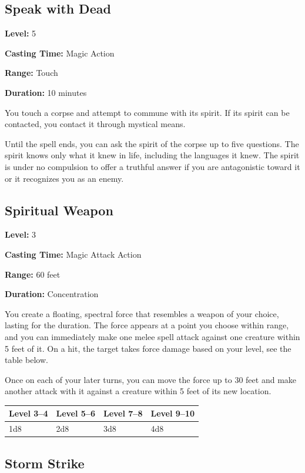 \documentclass[12pt,letterpaper,twocolumn,openany,nodeprecatedcode,bg=none]{dndbook}
\begin{document}
\subsection{Speak with Dead}\label{speak-with-dead}

\textbf{Level:} 5

\textbf{Casting Time:} Magic Action

\textbf{Range:} Touch

\textbf{Duration:} 10 minutes

You touch a corpse and attempt to commune with its spirit. If its spirit
can be contacted, you contact it through mystical means.

Until the spell ends, you can ask the spirit of the corpse up to five
questions. The spirit knows only what it knew in life, including the
languages it knew. The spirit is under no compulsion to offer a truthful
answer if you are antagonistic toward it or it recognizes you as an
enemy.

\subsection{Spiritual Weapon}\label{spiritual-weapon}

\textbf{Level:} 3

\textbf{Casting Time:} Magic Attack Action

\textbf{Range:} 60 feet

\textbf{Duration:} Concentration

You create a floating, spectral force that resembles a weapon of your
choice, lasting for the duration. The force appears at a point you
choose within range, and you can immediately make one melee spell attack
against one creature within 5 feet of it. On a hit, the target takes
force damage based on your level, see the table below.

Once on each of your later turns, you can move the force up to 30 feet
and make another attack with it against a creature within 5 feet of its
new location.

\begin{longtable}[]{@{}llll@{}}
\toprule\noalign{}
Level 3--4 & Level 5--6 & Level 7--8 & Level 9--10 \\
\midrule\noalign{}
\endhead
\bottomrule\noalign{}
\endlastfoot
1d8 & 2d8 & 3d8 & 4d8 \\
\end{longtable}

\subsection{Storm Strike}\label{storm-strike}
\end{document}
